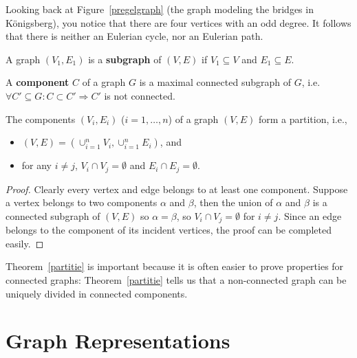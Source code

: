 \begin{example}
Looking back at Figure~\ref{pregelgraph} (the graph modeling the
bridges in K\"onigsberg), you notice that there are four vertices with an
odd degree. It follows that there is neither an Eulerian cycle, nor an Eulerian
path.
\end{example}



\begin{definition}[Subgraph]
  \textup{A graph $(V_1,E_1)$ is a \textbf{subgraph} of $(V,E)$ if
    $V_1 \subseteq V$ and $E_1 \subseteq E$.}
\end{definition}



 \begin{definition}
  \textup{A \textbf{component} $C$ of a graph $G$ is a maximal
    connected subgraph of $G$, i.e.
$\forall C' \subseteq G: C \subset C' \Rightarrow C'$ is not connected.}
\end{definition}

 \begin{theorem}
The components $(V_{i},E_{i})$ ($i=1,\ldots,n$) of a graph $(V,E)$
form a partition,
i.e.,\begin{itemize} 
\item
$(V,E) = (\cup_{i=1}^{n} V_{i},\cup_{i=1}^{n} E_{i})$, and
\item
for any $i \neq j$, $V_{i} \cap V_{j} = \emptyset$ and $E_{i} \cap E_{j} = \emptyset$.
\end{itemize}
\end{theorem}
\begin{proof}
Clearly every vertex and edge belongs to at least one component.
Suppose a vertex belongs to two components $\alpha$ and $\beta$, then
the union of $\alpha$ and $\beta$ is a connected subgraph of $(V,E)$
so $\alpha = \beta$, so $V_{i} \cap V_{j} = \emptyset$ for $i \neq
j$. Since an edge belongs to the component of its incident vertices,
the proof can be completed easily.
\end{proof}


Theorem~\ref{partitie} is important because it is often easier to
prove properties for connected graphs: Theorem~\ref{partitie} tells us
that a non-connected graph can be uniquely divided in connected
components.


\section{Graph Representations \label{voorstelgraph}}

